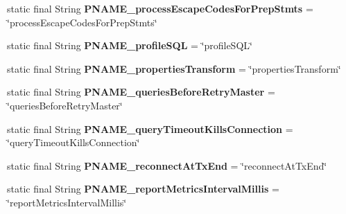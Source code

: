 \begin{DoxyCompactItemize}
\item 
\mbox{\label{classcom_1_1mysql_1_1cj_1_1conf_1_1_property_definitions_ad7dcd48ae55f4a295c4641f37db48236}} 
static final String {\bfseries P\+N\+A\+M\+E\+\_\+process\+Escape\+Codes\+For\+Prep\+Stmts} = \char`\"{}process\+Escape\+Codes\+For\+Prep\+Stmts\char`\"{}
\item 
\mbox{\label{classcom_1_1mysql_1_1cj_1_1conf_1_1_property_definitions_a35851c60e098a835ede4ce332cb36d2b}} 
static final String {\bfseries P\+N\+A\+M\+E\+\_\+profile\+S\+QL} = \char`\"{}profile\+S\+QL\char`\"{}
\item 
\mbox{\label{classcom_1_1mysql_1_1cj_1_1conf_1_1_property_definitions_a15f1ee4405755ed2f824c95fa87406be}} 
static final String {\bfseries P\+N\+A\+M\+E\+\_\+properties\+Transform} = \char`\"{}properties\+Transform\char`\"{}
\item 
\mbox{\label{classcom_1_1mysql_1_1cj_1_1conf_1_1_property_definitions_a0a08f48d1a3a65202c8f59e089475486}} 
static final String {\bfseries P\+N\+A\+M\+E\+\_\+queries\+Before\+Retry\+Master} = \char`\"{}queries\+Before\+Retry\+Master\char`\"{}
\item 
\mbox{\label{classcom_1_1mysql_1_1cj_1_1conf_1_1_property_definitions_ab23780e35d07d7bc2f41f51cb345f5f1}} 
static final String {\bfseries P\+N\+A\+M\+E\+\_\+query\+Timeout\+Kills\+Connection} = \char`\"{}query\+Timeout\+Kills\+Connection\char`\"{}
\item 
\mbox{\label{classcom_1_1mysql_1_1cj_1_1conf_1_1_property_definitions_a3f58fa4e79623dd24e21a68c8849facf}} 
static final String {\bfseries P\+N\+A\+M\+E\+\_\+reconnect\+At\+Tx\+End} = \char`\"{}reconnect\+At\+Tx\+End\char`\"{}
\item 
\mbox{\label{classcom_1_1mysql_1_1cj_1_1conf_1_1_property_definitions_a08d16a9058163b48d0cd59e7133aba4e}} 
static final String {\bfseries P\+N\+A\+M\+E\+\_\+report\+Metrics\+Interval\+Millis} = \char`\"{}report\+Metrics\+Interval\+Millis\char`\"{}

\end{DoxyCompactItemize}
